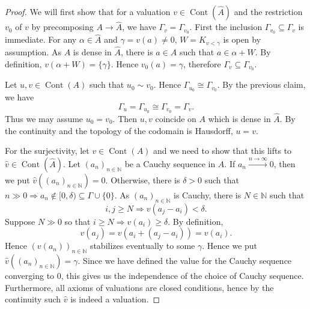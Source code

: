 \documentclass[10pt]{article}
\numberwithin{equation}{section}
\theoremstyle{definition}
\DeclareMathOperator{\Cont}{Cont}
\newcommand{\N}[0]{\mathbb{N}}
\begin{document}
\begin{proof}
    We will first show that for a valuation $v\in\Cont(\hat{A})$ and the restriction $v_0$ of $v$ by precomposing $A\to\hat{A}$, we have $\Gamma_v = \Gamma_{v_0}$. First the inclusion $\Gamma_{v_0}\subseteq\Gamma_v$ is immediate. For any $\alpha\in \hat{A}$ and $\gamma=v(a)\not=0$, $W=K_{v<\gamma}$ is open by assumption. As $A$ is dense in $\hat{A}$, there is $a\in A$ such that
    $a\in \alpha+W$. By definition, $v(\alpha+W) = \{\gamma\}$. Hence $v_0(a) = \gamma$, therefore $\Gamma_{v}\subseteq\Gamma_{v_0}$.
    \par Let $u,v\in\Cont(A)$ such that $u_0\sim v_0$. Hence $\Gamma_{u_0}\cong \Gamma_{v_0}$. By the previous claim, we have
    \begin{equation*}
        \Gamma_u =\Gamma_{u_0} \cong \Gamma_{v_0} =\Gamma_v.
    \end{equation*}
    Thus we may assume $u_0=v_0$. Then $u,v$ coincide on $A$ which is dense in $\hat{A}$. By the continuity and the topology of the codomain is Hausdorff, $u=v$.
    \par For the surjectivity, let $v\in\Cont(A)$ and we need to show that this lifts to $\hat{v}\in\Cont(\hat{A})$. Let $(a_n)_{n\in\N}$ be a Cauchy sequence in $A$. If $a_n\stackrel{n\to\infty}{\to}0$, then we put $\hat{v}((a_n)_{n\in\N}) = 0$.
    Otherwise, there is $\delta>0$ such that $n\gg 0\Rightarrow a_n\not\in [0,\delta)\subseteq\Gamma\cup\{0\}$. As $(a_n)_{n\in\N}$ is Cauchy, there is $N\in\N$ such that
    \begin{equation*}
        i,j\geq N\Rightarrow v(a_j-a_i)<\delta.
    \end{equation*}
    Suppose $N\gg0$ so that $i\geq N\Rightarrow v(a_i)\geq\delta$. By definition,
    \begin{equation*}
        v(a_j) = v(a_i+(a_j-a_i)) = v(a_i).
    \end{equation*}
    Hence $(v(a_n))_{n\in\N}$ stabilizes eventually to some $\gamma$. Hence we put $\hat{v}((a_n)_{n\in\N})= \gamma$. Since we have defined the value for the Cauchy sequence converging to $0$, this gives us the independence of the choice of Cauchy sequence.
    Furthermore, all axioms of valuations are closed conditions, hence by the continuity such $\hat{v}$ is indeed a valuation.
\end{proof}
\end{document}
